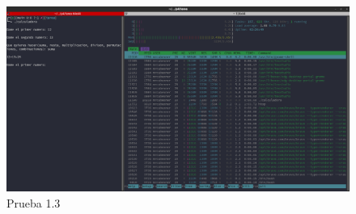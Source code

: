 \documentclass[10pt]{article}
\begin{document}
	\begin{figure}[h!]
		\centering
		\includegraphics[width=1\linewidth]{prueba3}
		\caption{Prueba 1.3}
		\label{fig:prueba3}
	\end{figure}
	
	
\end{document}
